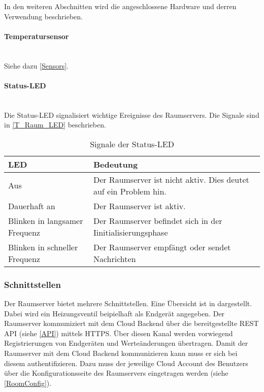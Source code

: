 In den weiteren Abschnitten wird die angeschlossene Hardware und derren Verwendung beschrieben.

\paragraph{Temperatursensor}\mbox{}\\\label{Temp}
Siehe dazu \autoref{Sensors}.

\paragraph{Status-LED}\mbox{}\\\label{Raum_LED}
Die Status-LED signalisiert wichtige Ereignisse des Raumservers. Die Signale sind in \autoref{T_Raum_LED} beschrieben.
\begin{table}[]
\centering
\begin{tabular}{|l|l|}
\hline
\textbf{LED}                  & \textbf{Bedeutung}                                               \\ \hline
Aus                           & Der Raumserver ist nicht aktiv. Dies deutet auf ein Problem hin. \\ \hline
Dauerhaft an                  & Der Raumserver ist aktiv.                                        \\ \hline
Blinken in langsamer Frequenz & Der Raumserver befindet sich in der Iinitialisierungsphase       \\ \hline
Blinken in schneller Frequenz & Der Raumserver empfängt oder sendet Nachrichten                  \\ \hline
\end{tabular}
\caption{Signale der Status-LED}
\label{T_Raum_LED}
\end{table}



\subsubsection{Schnittstellen}\label{Raum_Schnittstellen}
Der Raumserver bietet mehrere Schnittstellen. Eine Übersicht ist in  dargestellt. Dabei wird ein Heizungsventil beipielhaft als Endgerät angegeben.
Der Raumserver kommuniziert mit dem Cloud Backend über die bereitgestellte REST API (siehe \autoref{API}) mittels HTTPS. Über diesen Kanal werden vorwiegend Registrierungen von Endgeräten und Werteänderungen übertragen. Damit der Raumserver mit dem Cloud Backend kommunizieren kann muss er sich bei diesem authentifizieren. Dazu muss der jeweilige Cloud Account des Benutzers über die Konfigurationsseite des Raumservers eingetragen werden (siehe \autoref{RoomConfig}).

